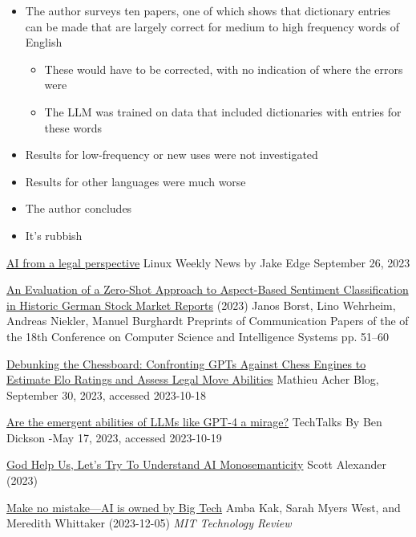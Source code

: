 \documentclass[25pt,a4paper,landscape,headrule,footrule,xetex]{foils}
\begin{document}
\begin{itemize}\addtolength{\itemsep}{-1ex}
\item The author surveys ten papers, one of which shows that dictionary entries can be made that are largely correct for medium to high frequency words of English
  \begin{itemize}
  \item These would have to be corrected, with no indication of where the errors were
  \item The LLM was trained on data that included dictionaries with entries for these words
  \end{itemize}
\item Results for low-frequency or new uses were not investigated
\item Results for other languages were much worse
\item The author concludes 
\item It's rubbish
\end{itemize}




\href{https://lwn.net/Articles/945504/}{AI from a legal perspective} Linux Weekly News by Jake Edge September 26, 2023


\href{https://annals-csis.org/proceedings/2023/pliks/3725.pdf}{An Evaluation of a Zero-Shot Approach to
Aspect-Based Sentiment Classification in Historic
German Stock Market Reports} (2023) Janos Borst, Lino Wehrheim, Andreas Niekler, Manuel Burghardt
Preprints of Communication Papers of the of the 18th Conference on Computer
Science and Intelligence Systems pp. 51–60

\href{https://blog.mathieuacher.com/GPTsChessEloRatingLegalMoves/}{Debunking the Chessboard: Confronting GPTs Against Chess Engines to Estimate Elo Ratings and Assess Legal Move Abilities} 
Mathieu Acher Blog, September 30, 2023, accessed 2023-10-18

\href{https://bdtechtalks.com/2023/05/17/llm-emergent-abilities-mirage/}{Are the emergent abilities of LLMs like GPT-4 a mirage?} TechTalks
By Ben Dickson -May 17, 2023, accessed 2023-10-19

\href{https://www.astralcodexten.com/p/god-help-us-lets-try-to-understand}{God Help Us, Let's Try To Understand AI Monosemanticity} Scott Alexander (2023)

\href{https://www.technologyreview.com/2023/12/05/1084393/make-no-mistake-ai-is-owned-by-big-tech/amp/}{Make no mistake—AI is owned by Big Tech}  Amba Kak, Sarah Myers West, and Meredith Whittaker (2023-12-05) \textit{MIT Technology Review}
\end{document}

